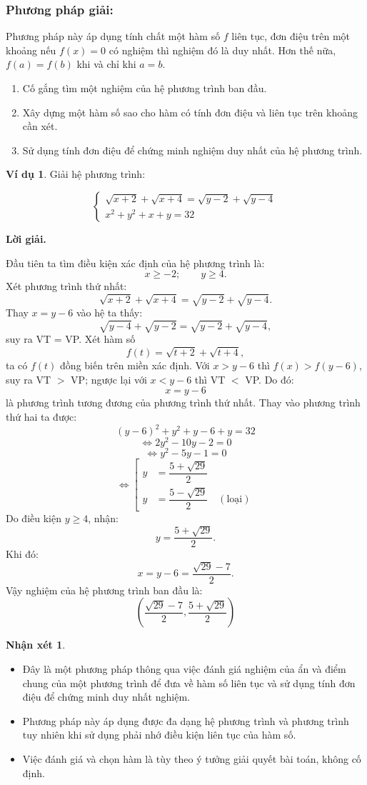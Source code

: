 \documentclass[12pt,a4paper,oneside]{book}
\theoremstyle{theorem}
\theoremstyle{definition}
\newtheorem{nx}[theorem2]{Nhận xét}
\newtheorem{vd}[theorem2]{Ví dụ}
\begin{document}
    \subsubsection{Phương pháp giải:}
    Phương pháp này áp dụng tính chất một hàm số $f$ liên tục, đơn điệu trên một khoảng nếu $f(x)=0$ có nghiệm thì nghiệm đó là duy nhất. Hơn thế nữa, $f(a)=f(b) $ khi và chỉ khi $a=b$. 
    \begin{enumerate}
        \item Cố gắng tìm một nghiệm của hệ phương trình ban đầu.
        \item Xây dựng một hàm số sao cho hàm có tính đơn điệu và liên tục trên khoảng cần xét.
        \item Sử dụng tính đơn điệu để chứng minh nghiệm duy nhất của hệ phương trình.
    \end{enumerate}
   \begin{vd} Giải hệ phương trình:

\[
\begin{cases}
\sqrt{x+2}+\sqrt{x+4}
=
\sqrt{y-2}+\sqrt{y-4}\\
x^2+y^2+x+y=32
\end{cases}
\]

\textbf{Lời giải.}

Đầu tiên ta tìm điều kiện xác định của hệ phương trình là:
\[x\ge -2;\qquad y\ge 4.
\]
Xét phương trình thứ nhất:
\[
\sqrt{x+2}+\sqrt{x+4}
=\sqrt{y-2}+\sqrt{y-4}.
\]
Thay \(x=y-6\) vào hệ ta thấy:
\[
\sqrt{y-4}+\sqrt{y-2}
=\sqrt{y-2}+\sqrt{y-4},
\]
suy ra VT = VP.
Xét hàm số
\[
f(t)=\sqrt{t+2}+\sqrt{t+4},
\]
ta có \(f(t)\) đồng biến trên miền xác định.
Với \(x>y-6\) thì \(f(x)>f(y-6)\), suy ra VT \(>\) VP; ngược lại với \(x<y-6\) thì VT \(<\) VP.
Do đó:
\[x=y-6\]
là phương trình tương đương của phương trình thứ nhất.
Thay vào phương trình thứ hai ta được:
\[
(y-6)^2+y^2+y-6+y=32
\]
\[
\Leftrightarrow
2y^2-10y-2=0
\]
\[
\Leftrightarrow y^2-5y-1=0\]
\[\Leftrightarrow
\left[
\begin{aligned}
y&=\dfrac{5+\sqrt{29}}{2}\\
y&=\dfrac{5-\sqrt{29}}{2}\quad (\text{loại})
\end{aligned}
\right.\]
Do điều kiện \(y\ge4\), nhận:
\[y=\dfrac{5+\sqrt{29}}{2}.
\]
Khi đó:
\[x=y-6=\dfrac{\sqrt{29}-7}{2}.\]
Vậy nghiệm của hệ phương trình ban đầu là:
\[
\boxed{
\left(
\dfrac{\sqrt{29}-7}{2},
\dfrac{5+\sqrt{29}}{2}
\right)
}
\]
\end{vd}
    \begin{nx}
        \begin{itemize}
            \item Đây là một phương pháp thông qua việc đánh giá nghiệm của ẩn và điểm chung của một phương trình để đưa về hàm số liên tục và sử dụng tính đơn điệu để chứng minh duy nhất nghiệm.
            \item Phương pháp này áp dụng được đa dạng hệ phương trình và phương trình tuy nhiên khi sử dụng phải nhớ điều kiện liên tục của hàm số.
            \item Việc đánh giá và chọn hàm là tùy theo ý tưởng giải quyết bài toán, không cố định.
        \end{itemize}
    \end{nx}
\end{document}
